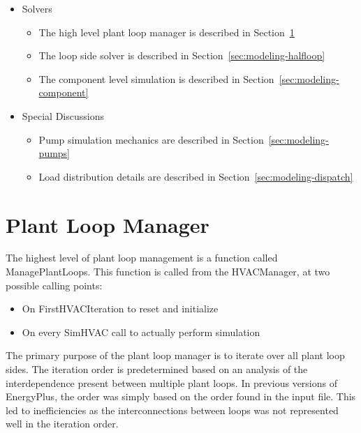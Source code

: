 \documentclass{report}
\begin{document}
    \begin{itemize}
        \item Solvers
        \begin{itemize}
            \item The high level plant loop manager is described in Section~\ref{sec:modeling-loop}
            \item The loop side solver is described in Section~\ref{sec:modeling-halfloop}
            \item The component level simulation is described in Section~\ref{sec:modeling-component}
        \end{itemize}
        \item Special Discussions
        \begin{itemize}
            \item Pump simulation mechanics are described in Section~\ref{sec:modeling-pumps}
            \item Load distribution details are described in Section~\ref{sec:modeling-dispatch}
        \end{itemize}
    \end{itemize}

    \section{Plant Loop Manager}\label{sec:modeling-loop}

    The highest level of plant loop management is a function called ManagePlantLoops.
    This function is called from the HVACManager, at two possible calling points:

    \begin{itemize}
        \item On FirstHVACIteration to reset and initialize
        \item On every SimHVAC call to actually perform simulation
    \end{itemize}

    The primary purpose of the plant loop manager is to iterate over all plant loop sides.
    The iteration order is predetermined based on an analysis of the interdependence present between multiple plant loops.
    In previous versions of EnergyPlus, the order was simply based on the order found in the input file.
    This led to inefficiencies as the interconnections between loops was not represented well in the iteration order.
\end{document}
